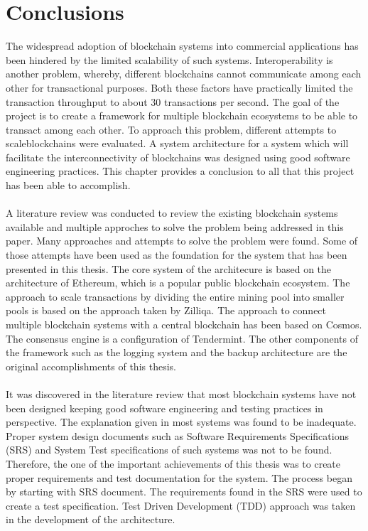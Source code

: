 \documentclass[a4paper,twoside,phd]{BYUPhys}
\begin{document}
\chapter{Conclusions}
The widespread adoption of blockchain systems into commercial applications has been hindered by the limited scalability of such systems. Interoperability is another problem, whereby, different blockchains cannot communicate among each other for transactional purposes. Both these factors have practically limited the transaction throughput to about 30 transactions per second. The goal of the project is to create a framework for multiple blockchain ecosystems to be able to transact among each other. To approach this problem, different attempts to scaleblockchains were evaluated. A system architecture for a system which will facilitate the interconnectivity of blockchains was designed using good software engineering practices. This chapter provides a conclusion to all that this project has been able to accomplish.  
\\
\\
A literature review was conducted to review the existing blockchain systems available and multiple approches to solve the problem being addressed in this paper. Many approaches and attempts to solve the problem were found. Some of those attempts have been used as the foundation for the system that has been presented in this thesis. The core system of the architecure is based on the architecture of Ethereum, which is a popular public blockchain ecosystem. The approach to scale transactions by dividing the entire mining pool into smaller pools is based on the approach taken by Zilliqa. The approach to connect multiple blockchain systems with a central blockchain has been based on Cosmos. The consensus engine is a configuration of Tendermint. The other components of the framework such as the logging system and the backup architecture are the original accomplishments of this thesis.
\\
\\
It was discovered in the literature review that most blockchain systems have not been designed keeping good software engineering and testing practices in perspective. The explanation given in most systems was found to be inadequate. Proper system design documents such as Software Requirements Specifications (SRS) and System Test specifications of such systems was not to be found. Therefore, the one of the important achievements of this thesis was to create proper requirements and test documentation for the system. The process began by starting with SRS document. The requirements found in the SRS were used to create a test specification. Test Driven Development (TDD) approach was taken in the development of the architecture.
\end{document}
